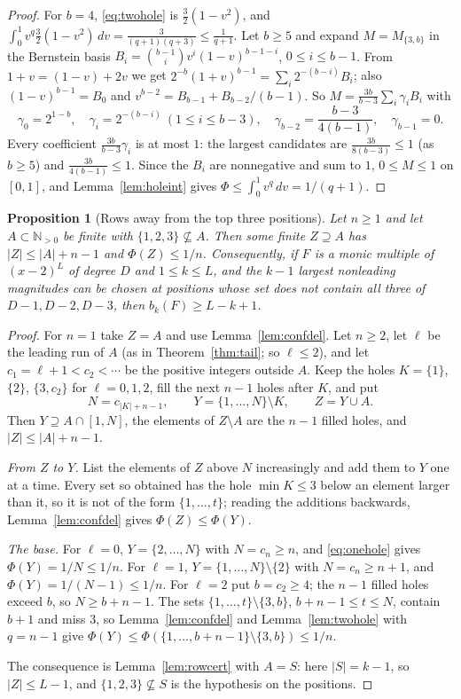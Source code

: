 \documentclass[11pt]{article}
\newtheorem{proposition}[theorem]{Proposition}
\newcommand{\N}{\mathbb N}
\begin{document}
\begin{proof}
For $b=4$, \eqref{eq:twohole} is $\tfrac32(1-v^2)$, and
$\int_0^1v^q\tfrac32(1-v^2)\,dv=\frac3{(q+1)(q+3)}\le\frac1{q+1}$.  Let
$b\ge5$ and expand $M=M_{\{3,b\}}$ in the Bernstein basis
$B_i=\binom{b-1}iv^i(1-v)^{b-1-i}$, $0\le i\le b-1$.  From
$1+v=(1-v)+2v$ we get
$2^{-b}(1+v)^{b-1}=\sum_i2^{-(b-i)}B_i$; also $(1-v)^{b-1}=B_0$ and
$v^{b-2}=B_{b-1}+B_{b-2}/(b-1)$.  So $M=\frac{3b}{b-3}\sum_i\gamma_iB_i$ with
\[
  \gamma_0=2^{1-b},\quad
  \gamma_i=2^{-(b-i)}\ (1\le i\le b-3),\quad
  \gamma_{b-2}=\frac{b-3}{4(b-1)},\quad
  \gamma_{b-1}=0 .
\]
Every coefficient $\frac{3b}{b-3}\gamma_i$ is at most $1$: the largest
candidates are $\frac{3b}{8(b-3)}\le1$ (as $b\ge5$) and $\frac{3b}{4(b-1)}\le1$.
Since the $B_i$ are nonnegative and sum to $1$, $0\le M\le1$ on $[0,1]$, and
Lemma~\ref{lem:holeint} gives
$\Phi\le\int_0^1v^q\,dv=1/(q+1)$.
\end{proof}

\begin{proposition}[Rows away from the top three positions]\label{prop:rowsfree}
Let $n\ge1$ and let $A\subset\N_{>0}$ be finite with
$\{1,2,3\}\not\subseteq A$.  Then some finite $Z\supseteq A$ has
$|Z|\le|A|+n-1$ and $\Phi(Z)\le1/n$.  Consequently, if $F$ is a monic
multiple of $(x-2)^L$ of degree $D$ and $1\le k\le L$, and the $k-1$ largest
nonleading magnitudes can be chosen at positions whose set does not contain all
three of $D-1,D-2,D-3$, then $b_k(F)\ge L-k+1$.
\end{proposition}

\begin{proof}
For $n=1$ take $Z=A$ and use Lemma~\ref{lem:confdel}.  Let $n\ge2$, let $\ell$
be the leading run of $A$ (as in Theorem~\ref{thm:tail}; so $\ell\le2$), and let $c_1=\ell+1<c_2<\cdots$ be the
positive integers outside $A$.  Keep the holes
$K=\{1\}$, $\{2\}$, $\{3,c_2\}$ for $\ell=0,1,2$, fill the next $n-1$ holes
after $K$, and put
\[
  N=c_{|K|+n-1},\qquad Y=\{1,\ldots,N\}\setminus K,\qquad Z=Y\cup A .
\]
Then $Y\supseteq A\cap[1,N]$, the elements of $Z\setminus A$ are the $n-1$
filled holes, and $|Z|\le|A|+n-1$.

\emph{From $Z$ to $Y$.}  List the elements of $Z$ above $N$ increasingly and
add them to $Y$ one at a time.  Every set so obtained has the hole
$\min K\le3$ below an element larger than it, so it is not of the form
$\{1,\ldots,t\}$; reading the additions backwards, Lemma~\ref{lem:confdel}
gives $\Phi(Z)\le\Phi(Y)$.

\emph{The base.}  For $\ell=0$, $Y=\{2,\ldots,N\}$ with $N=c_n\ge n$, and
\eqref{eq:onehole} gives $\Phi(Y)=1/N\le1/n$.  For $\ell=1$,
$Y=\{1,\ldots,N\}\setminus\{2\}$ with $N=c_n\ge n+1$, and
$\Phi(Y)=1/(N-1)\le1/n$.  For $\ell=2$ put $b=c_2\ge4$; the $n-1$ filled holes
exceed $b$, so $N\ge b+n-1$.  The sets
$\{1,\ldots,t\}\setminus\{3,b\}$, $b+n-1\le t\le N$, contain $b+1$ and miss
$3$, so Lemma~\ref{lem:confdel} and Lemma~\ref{lem:twohole} with $q=n-1$ give
$\Phi(Y)\le\Phi(\{1,\ldots,b+n-1\}\setminus\{3,b\})\le1/n$.

The consequence is Lemma~\ref{lem:rowcert} with $A=S$: here $|S|=k-1$, so
$|Z|\le L-1$, and $\{1,2,3\}\not\subseteq S$ is the hypothesis on the
positions.
\end{proof}
\end{document}
